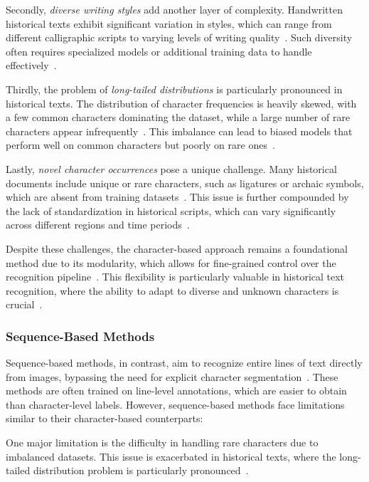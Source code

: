 Secondly, \textit{diverse writing styles} add another layer of complexity. Handwritten historical texts exhibit significant variation in styles, which can range from different calligraphic scripts to varying levels of writing quality~\cite{obc306}. Such diversity often requires specialized models or additional training data to handle effectively~\cite{stylevar}.

Thirdly, the problem of \textit{long-tailed distributions} is particularly pronounced in historical texts. The distribution of character frequencies is heavily skewed, with a few common characters dominating the dataset, while a large number of rare characters appear infrequently~\cite{fewran}. This imbalance can lead to biased models that perform well on common characters but poorly on rare ones~\cite{imbalance}.

Lastly, \textit{novel character occurrences} pose a unique challenge. Many historical documents include unique or rare characters, such as ligatures or archaic symbols, which are absent from training datasets~\cite{hde, ligarature}. This issue is further compounded by the lack of standardization in historical scripts, which can vary significantly across different regions and time periods~\cite{novelty}.

Despite these challenges, the character-based approach remains a foundational method due to its modularity, which allows for fine-grained control over the recognition pipeline~\cite{modular}. This flexibility is particularly valuable in historical text recognition, where the ability to adapt to diverse and unknown characters is crucial~\cite{adapability}.

\subsubsection{Sequence-Based Methods}

Sequence-based methods, in contrast, aim to recognize entire lines of text directly from images, bypassing the need for explicit character segmentation~\cite{eccvfork, jinic21}. These methods are often trained on line-level annotations, which are easier to obtain than character-level labels. However, sequence-based methods face limitations similar to their character-based counterparts:

One major limitation is the difficulty in handling rare characters due to imbalanced datasets. This issue is exacerbated in historical texts, where the long-tailed distribution problem is particularly pronounced~\cite{imbalance, fewran}.

